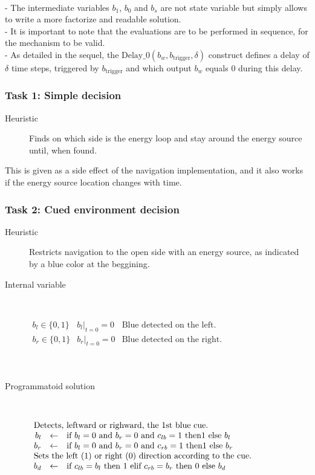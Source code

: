 \documentclass[a4]{article} \usepackage[left=2cm,right=3cm,top=1cm,bottom=2cm]{geometry}
\newcommand{\eqline}[1]{~\vspace{0.1cm}\\\centerline{$#1$}\vspace{0.1cm}\\}
\begin{document}
~\\- The intermediate variables $b_1$, $b_0$ and $b_s$ are not state variable but simply allows to write a more factorize and readable solution.
\\-  It is important to note that the evaluations are to be performed in sequence, for the mechanism to be valid.
\\- As detailed in the sequel, the $\mbox{Delay\_0}(b_w, b_{\mbox{trigger}}, \delta)$ construct defines a delay of $\delta$ time steps, triggered by $b_{\mbox{trigger}}$ and which output $b_w$ equals $0$ during this delay.

\subsubsection{Task 1: Simple decision} \begin{description}
  \item[Heuristic]  Finds on which side is the energy loop and stay around the energy source until, when found.
\end{description}

This is given as a side effect of the navigation implementation, and it also works if the energy source location changes with time.

\subsubsection{Task 2: Cued environment decision} \begin{description}
\item[Heuristic] Restricts navigation to the open side with an energy source, as indicated by a blue color at the beggining.
    \item[Internal variable] \eqline{\begin{array}{lll}
        b_l \in \{0, 1\}  & \left. b_l \right|_{t = 0} = 0 & \mbox{Blue detected on the left.} \\
        b_r \in \{0, 1\}  & \left. b_r \right|_{t = 0} = 0 & \mbox{Blue detected on the right.} \\
    \end{array}}
    \item[Programmatoid solution] \eqline{\begin{array}{rcl}
        \multicolumn{3}{l}{\mbox{Detects, leftward or righward, the 1st blue cue.}} \\
        b_l &\leftarrow& \mbox{if }  b_l = 0 \mbox{ and } b_r = 0 \mbox{ and } c_{lb} = 1 \mbox{ then} 1 \mbox{ else } b_l \\
        b_r &\leftarrow& \mbox{if }  b_l = 0 \mbox{ and } b_r = 0 \mbox{ and } c_{rb} = 1 \mbox{ then} 1 \mbox{ else } b_r \\
        \multicolumn{3}{l}{\mbox{Sets the left (1) or right (0) direction according to the cue.}} \\
        b_d &\leftarrow& \mbox{if }  c_{lb} = b_l \mbox{ then } 1 \mbox{ elif } c_{rb} = b_r \mbox{ then } 0 \mbox{ else } b_d \\
\end{array}} \end{description}
\end{document}
